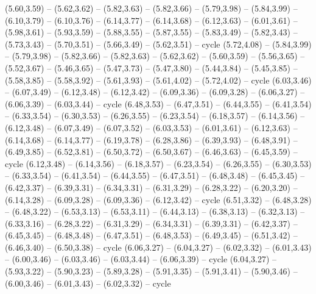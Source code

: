 \expandafter\def\csname geo:gebiet:MLI\endcsname{
  (5.60,3.59) -- (5.62,3.62) -- (5.82,3.63) -- (5.82,3.66) -- (5.79,3.98) -- (5.84,3.99) -- (6.10,3.79) -- (6.10,3.76) -- (6.14,3.77) -- (6.14,3.68) -- (6.12,3.63) -- (6.01,3.61) -- (5.98,3.61) -- (5.93,3.59) -- (5.88,3.55) -- (5.87,3.55) -- (5.83,3.49) -- (5.82,3.43) -- (5.73,3.43) -- (5.70,3.51) -- (5.66,3.49) -- (5.62,3.51) -- cycle}
\expandafter\def\csname geo:gebiet:MRT\endcsname{
  (5.72,4.08) -- (5.84,3.99) -- (5.79,3.98) -- (5.82,3.66) -- (5.82,3.63) -- (5.62,3.62) -- (5.60,3.59) -- (5.56,3.65) -- (5.52,3.67) -- (5.46,3.65) -- (5.47,3.73) -- (5.47,3.80) -- (5.44,3.84) -- (5.45,3.85) -- (5.58,3.85) -- (5.58,3.92) -- (5.61,3.93) -- (5.61,4.02) -- (5.72,4.02) -- cycle}
\expandafter\def\csname geo:gebiet:BEN\endcsname{
  (6.03,3.46) -- (6.07,3.49) -- (6.12,3.48) -- (6.12,3.42) -- (6.09,3.36) -- (6.09,3.28) -- (6.06,3.27) -- (6.06,3.39) -- (6.03,3.44) -- cycle}
\expandafter\def\csname geo:gebiet:NER\endcsname{
  (6.48,3.53) -- (6.47,3.51) -- (6.44,3.55) -- (6.41,3.54) -- (6.33,3.54) -- (6.30,3.53) -- (6.26,3.55) -- (6.23,3.54) -- (6.18,3.57) -- (6.14,3.56) -- (6.12,3.48) -- (6.07,3.49) -- (6.07,3.52) -- (6.03,3.53) -- (6.01,3.61) -- (6.12,3.63) -- (6.14,3.68) -- (6.14,3.77) -- (6.19,3.78) -- (6.28,3.86) -- (6.39,3.93) -- (6.48,3.91) -- (6.49,3.85) -- (6.52,3.81) -- (6.50,3.72) -- (6.50,3.67) -- (6.46,3.63) -- (6.45,3.59) -- cycle}
\expandafter\def\csname geo:gebiet:NGA\endcsname{
  (6.12,3.48) -- (6.14,3.56) -- (6.18,3.57) -- (6.23,3.54) -- (6.26,3.55) -- (6.30,3.53) -- (6.33,3.54) -- (6.41,3.54) -- (6.44,3.55) -- (6.47,3.51) -- (6.48,3.48) -- (6.45,3.45) -- (6.42,3.37) -- (6.39,3.31) -- (6.34,3.31) -- (6.31,3.29) -- (6.28,3.22) -- (6.20,3.20) -- (6.14,3.28) -- (6.09,3.28) -- (6.09,3.36) -- (6.12,3.42) -- cycle}
\expandafter\def\csname geo:gebiet:CMR\endcsname{
  (6.51,3.32) -- (6.48,3.28) -- (6.48,3.22) -- (6.53,3.13) -- (6.53,3.11) -- (6.44,3.13) -- (6.38,3.13) -- (6.32,3.13) -- (6.33,3.16) -- (6.28,3.22) -- (6.31,3.29) -- (6.34,3.31) -- (6.39,3.31) -- (6.42,3.37) -- (6.45,3.45) -- (6.48,3.48) -- (6.47,3.51) -- (6.48,3.53) -- (6.49,3.45) -- (6.51,3.42) -- (6.46,3.40) -- (6.50,3.38) -- cycle}
\expandafter\def\csname geo:gebiet:TGO\endcsname{
  (6.06,3.27) -- (6.04,3.27) -- (6.02,3.32) -- (6.01,3.43) -- (6.00,3.46) -- (6.03,3.46) -- (6.03,3.44) -- (6.06,3.39) -- cycle}
\expandafter\def\csname geo:gebiet:GHA\endcsname{
  (6.04,3.27) -- (5.93,3.22) -- (5.90,3.23) -- (5.89,3.28) -- (5.91,3.35) -- (5.91,3.41) -- (5.90,3.46) -- (6.00,3.46) -- (6.01,3.43) -- (6.02,3.32) -- cycle}
